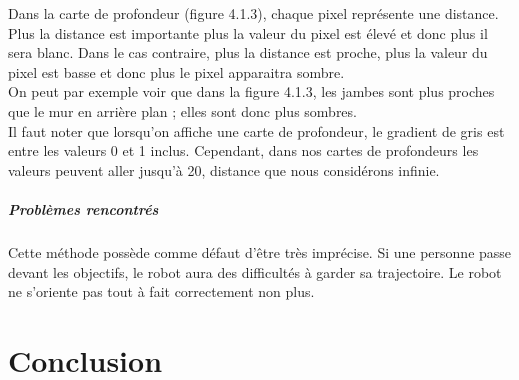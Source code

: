 \documentclass[12pt,a4paper]{report}
\begin{document}
Dans la carte de profondeur (figure 4.1.3), chaque pixel représente une distance. Plus la distance est importante plus la valeur du pixel est élevé et donc plus il sera blanc. Dans le cas contraire, plus la distance est proche, plus la valeur du pixel est basse et donc plus le pixel apparaitra sombre.\\
On peut par exemple voir que dans la figure 4.1.3, les jambes sont plus proches que le mur en arrière plan ; elles sont donc plus sombres.\\
Il faut noter que lorsqu'on affiche une carte de profondeur, le gradient de gris est entre les valeurs 0 et 1 inclus. Cependant, dans nos cartes de profondeurs les valeurs peuvent aller jusqu'à 20, distance que nous considérons infinie.

\paragraph{Problèmes rencontrés}
Cette méthode possède comme défaut d'être très imprécise. Si une personne passe devant les objectifs, le robot aura des difficultés à garder sa trajectoire. Le robot ne s'oriente pas tout à fait correctement non plus.

\chapter{Conclusion}
\end{document}
